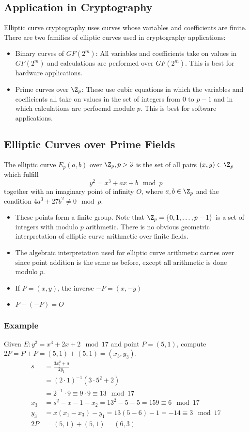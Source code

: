 \documentclass{math}
\begin{document}
\subsection*{Application in Cryptography}
Elliptic curve cryptography uses curves whose variables and coefficients are
finite. There are two families of elliptic curves used in cryptography
applications:
\begin{itemize}
  \item Binary curves of \( GF(2^m) \): All variables and coefficients take on
  values in \( GF(2^m) \) and calculations are performed over \( GF(2^m) \).
  This is best for hardware applications.
  \item Prime curves over \( \Z_p \): These use cubic equations in which the
  variables and coefficients all take on values in the set of integers from
  \( 0 \) to \( p-1 \) and in which calculations are perfoemd module \( p \).
  This is best for software applications.
\end{itemize}

\subsection*{Elliptic Curves over Prime Fields}
The elliptic curve \( E_p(a,b) \) over \( \Z_p, p>3 \) is the set of all pairs
\( (x,y)\in\Z_p \) which fulfill
\[ y^2 = x^3+ax+b\mod p \]
together with an imaginary point of infinity \( O \), where \( a,b\in\Z_p \)
and the condition \( 4a^3+27b^2\ne 0\mod p \).
\begin{itemize}
  \item These points form a finite group. Note that \( \Z_p = \{0,1,\dots,p-1\}
  \) is a set of integers with modulo \( p \) arithmetic. There is no obvious
  geometric interpretation of elliptic curve arithmetic over finite fields.
  \item The algebraic interpretation used for elliptic curve arithmetic carries
  over since point addition is the same as before, except all arithmetic is
  done modulo \( p \).
  \item If \( P = (x,y) \), the inverse \( -P = (x,-y) \)
  \item \( P+(-P) = O \)
\end{itemize}

\subsubsection*{Example}
Given \( E: y^2 = x^3+2x+2\mod 17 \) and point \( P = (5,1) \), compute
\( 2P = P+P = (5,1)+(5,1) = (x_3,y_3) \).
\begin{align*}
  s &= \frac{3x_1^2+a}{2y_1} \\
  &= (2\cdot1)^{-1}(3\cdot5^2+2) \\
  &= 2^{-1}\cdot9 \equiv 9\cdot9 \equiv 13\mod17 \\
  x_3 &= s^2-x-1-x_2 = 13^2-5-5 = 159 \equiv 6\mod17 \\
  y_3 &= x(x_1-x_3)-y_1 = 13(5-6)-1 = -14 \equiv 3\mod17 \\
  2P &= (5,1)+(5,1) = (6,3)
\end{align*}
\end{document}
